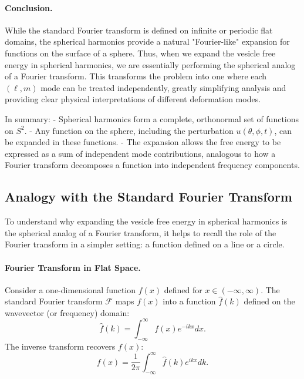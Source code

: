 \documentclass[12pt,a4paper]{article}
\begin{document}
\paragraph{Conclusion.}

While the standard Fourier transform is defined on infinite or periodic flat domains, the spherical harmonics provide a natural "Fourier-like" expansion for functions on the surface of a sphere. Thus, when we expand the vesicle free energy in spherical harmonics, we are essentially performing the spherical analog of a Fourier transform. This transforms the problem into one where each $(\ell,m)$ mode can be treated independently, greatly simplifying analysis and providing clear physical interpretations of different deformation modes.

In summary:
- Spherical harmonics form a complete, orthonormal set of functions on $S^2$.
- Any function on the sphere, including the perturbation $u(\theta,\phi,t)$, can be expanded in these functions.
- The expansion allows the free energy to be expressed as a sum of independent mode contributions, analogous to how a Fourier transform decomposes a function into independent frequency components.

\subsection{Analogy with the Standard Fourier Transform}

To understand why expanding the vesicle free energy in spherical harmonics is the spherical analog of a Fourier transform, it helps to recall the role of the Fourier transform in a simpler setting: a function defined on a line or a circle.

\paragraph{Fourier Transform in Flat Space.}

Consider a one-dimensional function $f(x)$ defined for $x \in (-\infty,\infty)$. The standard Fourier transform $\mathcal{F}$ maps $f(x)$ into a function $\hat{f}(k)$ defined on the wavevector (or frequency) domain:
\begin{equation}
\hat{f}(k) = \int_{-\infty}^{\infty} f(x) e^{-i k x} dx.
\end{equation}
The inverse transform recovers $f(x)$:
\begin{equation}
f(x) = \frac{1}{2\pi}\int_{-\infty}^{\infty} \hat{f}(k) e^{i k x} dk.
\end{equation}
\end{document}
